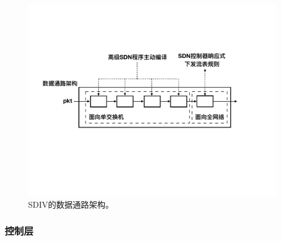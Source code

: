 \documentclass{ctexart}
\begin{document}
\begin{figure} [t]
\begin{center}
\includegraphics[width=0.8\columnwidth]{figures/sdiv-dp.pdf}
\vspace{-0.2in}
\caption{SDIV的数据通路架构。} \label{fig:sdiv-dp}
\end{center}
\vspace{-0.3in}
\end{figure}



\subsubsection{控制层}
\end{document}
